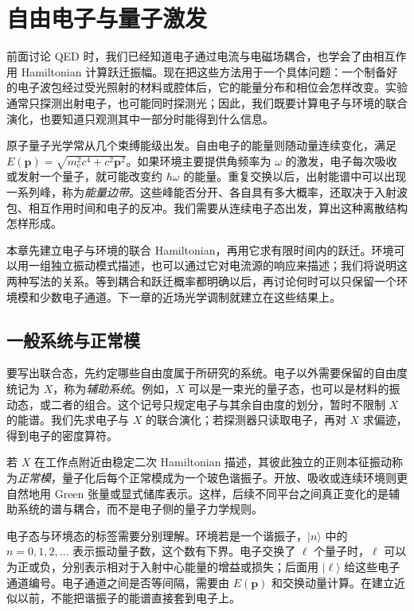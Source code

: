 \chapter{自由电子与量子激发}\label{chap:general-interaction}

前面讨论 QED 时，我们已经知道电子通过电流与电磁场耦合，也学会了由相互作用 Hamiltonian 计算跃迁振幅。现在把这些方法用于一个具体问题：一个制备好的电子波包经过受光照射的材料或腔体后，它的能量分布和相位会怎样改变。实验通常只探测出射电子，也可能同时探测光；因此，我们既要计算电子与环境的联合演化，也要知道只观测其中一部分时能得到什么信息。\cite{Barwick2009PINEM,Feist2015Nature,Dahan2021Science}

原子量子光学常从几个束缚能级出发。自由电子的能量则随动量连续变化，满足 $E(\mathbf p)=\sqrt{m_{\mathrm e}^2c^4+c^2\mathbf p^2}$。如果环境主要提供角频率为 $\omega$ 的激发，电子每次吸收或发射一个量子，就可能改变约 $\hbar\omega$ 的能量。重复交换以后，出射能谱中可以出现一系列峰，称为\emph{能量边带}。这些峰能否分开、各自具有多大概率，还取决于入射波包、相互作用时间和电子的反冲。我们需要从连续电子态出发，算出这种离散结构怎样形成。

本章先建立电子与环境的联合 Hamiltonian，再用它求有限时间内的跃迁。环境可以用一组独立振动模式描述，也可以通过它对电流源的响应来描述；我们将说明这两种写法的关系。等到耦合和跃迁概率都明确以后，再讨论何时可以只保留一个环境模和少数电子通道。下一章的近场光学调制就建立在这些结果上。\cite{GarciaDeAbajoDiGiulio2021,RoquesCarmes2023APR,Ruimy2025Perspective}

\section{一般系统与正常模}

要写出联合态，先约定哪些自由度属于所研究的系统。电子以外需要保留的自由度统记为 $X$，称为\emph{辅助系统}。例如，$X$ 可以是一束光的量子态，也可以是材料的振动态，或二者的组合。这个记号只规定电子与其余自由度的划分，暂时不限制 $X$ 的能谱。我们先求电子与 $X$ 的联合演化；若探测器只读取电子，再对 $X$ 求偏迹，得到电子的密度算符。

若 $X$ 在工作点附近由稳定二次 Hamiltonian 描述，其彼此独立的正则本征振动称为\emph{正常模}，量子化后每个正常模成为一个玻色谐振子。开放、吸收或连续环境则更自然地用 Green 张量或显式储库表示。这样，后续不同平台之间真正变化的是辅助系统的谱与耦合，而不是电子侧的量子力学规则。

\GeneralInteractionRecoilFigure

电子态与环境态的标签需要分别理解。环境若是一个谐振子，$|n\rangle$ 中的 $n=0,1,2,\ldots$ 表示振动量子数，这个数有下界。电子交换了 $\ell$ 个量子时，$\ell$ 可以为正或负，分别表示相对于入射中心能量的增益或损失；后面用 $|\ell\rangle$ 给这些电子通道编号。电子通道之间是否等间隔，需要由 $E(\mathbf p)$ 和交换动量计算。在建立近似以前，不能把谐振子的能谱直接套到电子上。

